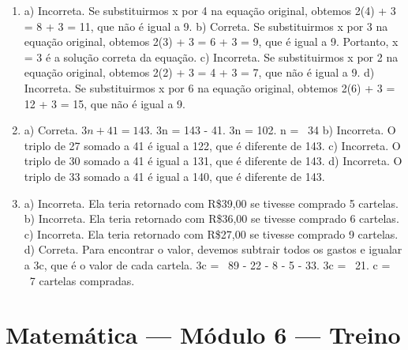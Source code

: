 \begin{enumerate}
\item a) Incorreta. Se substituirmos x por 4 na equação original, obtemos 2(4) + 3 = 8 + 3 = 11, que não é igual a 9.
b) Correta. Se substituirmos x por 3 na equação original, obtemos 2(3) + 3 = 6 + 3 = 9, que é igual a 9. Portanto, x = 3 é a solução correta da equação.
c) Incorreta. Se substituirmos x por 2 na equação original, obtemos 2(2) + 3 = 4 + 3 = 7, que não é igual a 9.
d) Incorreta. Se substituirmos x por 6 na equação original, obtemos 2(6) + 3 = 12 + 3 = 15, que não é igual a 9.

\item a) Correta. \(3n + 41 = 143\). 3n = 143 - 41. 3n = 102. n = \ 34
b) Incorreta. O triplo de 27 somado a 41 é igual a 122, que é diferente de 143.
c) Incorreta. O triplo de 30 somado a 41 é igual a 131, que é diferente de 143.
d) Incorreta. O triplo de 33 somado a 41 é igual a 140, que é diferente de 143.

\item a) Incorreta. Ela teria retornado com R\$39,00 se tivesse comprado 5 cartelas.
b) Incorreta. Ela teria retornado com R\$36,00 se tivesse comprado 6 cartelas.
c) Incorreta. Ela teria retornado com R\$27,00 se tivesse comprado 9 cartelas.
d) Correta. Para encontrar o valor, devemos subtrair todos os gastos e igualar a 3c, que é o valor de cada cartela. 3c = \ 89 - 22 - 8 - 5 - 33. 3c = \ 21. c = \ 7 cartelas compradas.
\end{enumerate}

\section*{Matemática — Módulo 6 — Treino}

